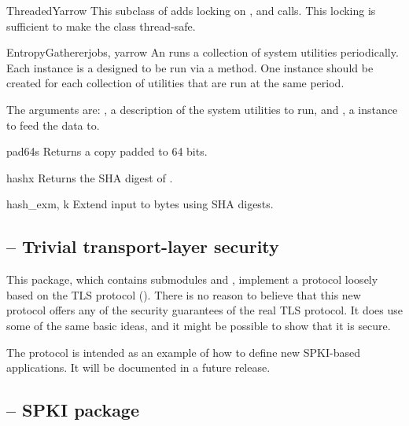 \documentclass{howto}
\begin{document}
\begin{classdesc}{ThreadedYarrow}{}
This subclass of  adds locking on ,
 and  calls.  This locking is
sufficient to make the class thread-safe.
\end{classdesc}

\begin{classdesc}{EntropyGatherer}{jobs, yarrow}
An  runs a collection of system utilities
periodically.  Each instance is a  designed
to be run via a  method.  One instance should be created
for each collection of utilities that are run at the same period.

The arguments are: , a description of the system utilities
to run, and , a  instance to feed the data
to. 

\end{classdesc}

\begin{funcdesc}{pad64}{s}
Returns a copy  padded to 64 bits.
\end{funcdesc}

\begin{funcdesc}{hash}{x}
Returns the SHA digest of .
\end{funcdesc}

\begin{funcdesc}{hash_ex}{m, k}
Extend input  to  bytes using SHA digests.
\end{funcdesc}

\subsection{
	-- Trivial transport-layer security}

This package, which contains submodules  and
, implement a protocol loosely based on the TLS
protocol ().  There is no reason to believe that this new
protocol offers any of the security guarantees of the real TLS
protocol.  It does use some of the same basic ideas, and it might be
possible to show that it is secure.

The protocol is intended as an example of how to define new SPKI-based
applications.  It will be documented in a future release.

\subsection{
	-- SPKI package}
\end{document}
